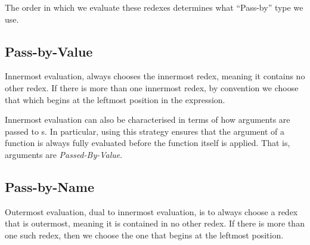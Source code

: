 The order in which we evaluate these redexes determines what ``Pass-by'' type we use.

\subsection{Pass-by-Value}\label{subsec:Pass_by_Value}
Innermost evaluation, always chooses the innermost redex, meaning it contains no other redex.
If there is more than one innermost redex, by convention we choose that which begins at the leftmost position in the expression.

Innermost evaluation can also be characterised in terms of how arguments are passed to s.
In particular, using this strategy ensures that the argument of a function is always fully evaluated before the function itself is applied.
That is, arguments are \emph{Passed-By-Value}.

\subsection{Pass-by-Name}\label{subsec:Pass_by_Name}
Outermost evaluation, dual to innermost evaluation, is to always choose a redex that is outermost, meaning it is contained in no other redex.
If there is more than one such redex, then we choose the one that begins at the leftmost position.


